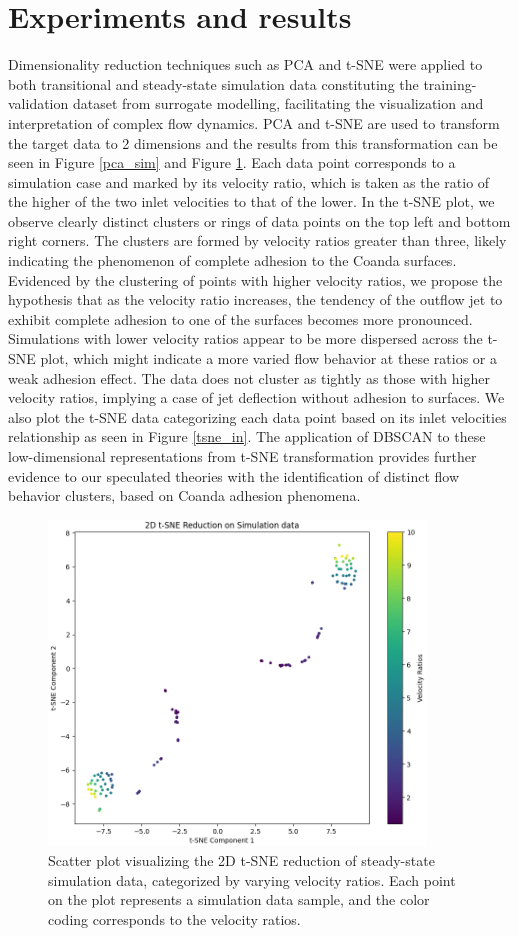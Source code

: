 \section{Experiments and results}
Dimensionality reduction techniques such as PCA and t-SNE were applied to both transitional and steady-state simulation data constituting the training-validation dataset from surrogate modelling, facilitating the visualization and interpretation of complex flow dynamics. PCA and t-SNE are used to transform the target data to 2 dimensions and the results from this transformation can be seen in Figure \ref{pca_sim} and Figure \ref{tsne_sim}. Each data point corresponds to a simulation case and marked by its velocity ratio, which is taken as the ratio of the higher of the two inlet velocities to that of the lower. In the t-SNE plot, we observe clearly distinct clusters or rings of data points on the top left and bottom right corners. The clusters are formed by velocity ratios greater than three, likely indicating the phenomenon of complete adhesion to the Coanda surfaces. Evidenced by the clustering of points with higher velocity ratios, we propose the hypothesis that as the velocity ratio increases, the tendency of the outflow jet to exhibit complete adhesion to one of the surfaces becomes more pronounced. Simulations with lower velocity ratios appear to be more dispersed across the t-SNE plot, which might indicate a more varied flow behavior at these ratios or a weak adhesion effect. The data does not cluster as tightly as those with higher velocity ratios, implying a case of jet deflection without adhesion to surfaces. We also plot the t-SNE data categorizing each data point based on its inlet velocities relationship as seen in Figure \ref{tsne_in}. The application of DBSCAN to these low-dimensional representations from t-SNE transformation provides further evidence to our speculated theories with the identification of distinct flow behavior clusters, based on Coanda adhesion phenomena. 
\begin{figure}[ht]
    \centering
    \includegraphics[width=10cm]{images/Clustering/tsne_sim_cmap.png}
    \caption{Scatter plot visualizing the 2D t-SNE reduction of steady-state simulation data, categorized by varying velocity ratios. Each point on the plot represents a simulation data sample, and the color coding corresponds to the velocity ratios. }
    \label{tsne_sim}
    \end{figure}
